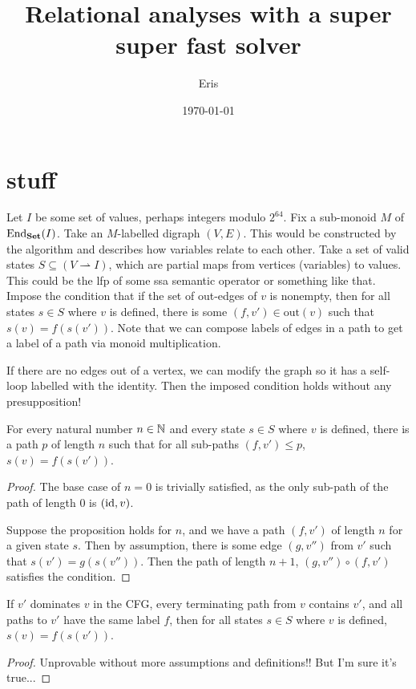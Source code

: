 \documentclass{article}
\title{Relational analyses with a super super fast solver}
\author{Eris}
\date{\today}
\begin{document}
\maketitle

\section{stuff}

Let \(I\) be some set of values, perhaps integers modulo \(2^{64}\).
Fix a sub-monoid \(M\) of \(\operatorname{End}_{\mathbf{Set}}(I)\).
Take an \(M\)-labelled digraph \((V, E)\).
This would be constructed by the algorithm and describes how variables relate to each other.
Take a set of valid states \(S \subseteq (V \rightharpoonup I)\), which are partial maps from vertices (variables) to values.
This could be the lfp of some ssa semantic operator or something like that.
Impose the condition that if the set of out-edges of \(v\) is nonempty, then for all states \(s \in S\) where \(v\) is defined, there is some \((f, v') \in \mathrm{out}(v)\) such that \(s(v) = f(s(v'))\).
Note that we can compose labels of edges in a path to get a label of a path via monoid multiplication.

If there are no edges out of a vertex, we can modify the graph so it has a self-loop labelled with the identity.
Then the imposed condition holds without any presupposition!

\begin{lemma}
    For every natural number \(n \in \mathbb{N}\) and every state \(s \in S\) where \(v\) is defined, there is a path \(p\) of length \(n\) such that for all sub-paths \((f, v') \leq p\), \(s(v) = f(s(v'))\).
\end{lemma}
\begin{proof}
    The base case of \(n = 0\) is trivially satisfied, as the only sub-path of the path of length \(0\) is \((\mathrm{id}, v)\).

    Suppose the proposition holds for \(n\), and we have a path \((f, v')\) of length \(n\) for a given state \(s\).
    Then by assumption, there is some edge \((g, v'')\) from \(v'\) such that \(s(v') = g(s(v''))\).
    Then the path of length \(n+1\), \((g, v'') \circ (f, v')\) satisfies the condition.
\end{proof}

\begin{lemma}
    If \(v'\) dominates \(v\) in the CFG, every terminating path from \(v\) contains \(v'\), and all paths to \(v'\) have the same label \(f\), then for all states \(s \in S\) where \(v\) is defined, \(s(v) = f(s(v'))\).
\end{lemma}
\begin{proof}
    Unprovable without more assumptions and definitions!!
    But I'm sure it's true...
\end{proof}
\end{document}
